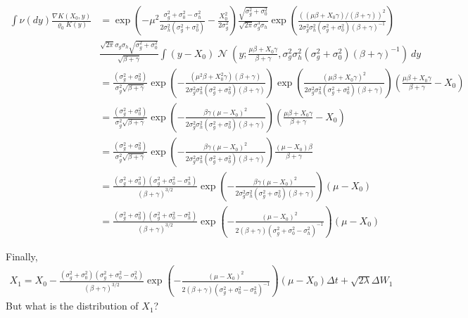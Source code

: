 \documentclass[a4paper]{amsart}
\DeclareMathOperator{\N}{\mathcal{N}}
\begin{document}
\begin{align*}
\int \nu(dy)\frac{\nabla K(X_0, y)}{\varrho_0 K(y)} &= \exp\left( -\mu^2\frac{\sigma_g^2 + \sigma_0^2 - \sigma_h^2}{2\sigma_h^2(\sigma_g^2 + \sigma_0^2)} - \frac{X_0^2}{2\sigma_g^2}\right)\frac{\sqrt{\sigma_g^2 + \sigma_0^2}}{\sqrt{2\pi}\sigma_g^3\sigma_h}\exp\left( \frac{\left((\mu \beta + X_0\gamma)/(\beta + \gamma)\right)^2}{2\sigma_g^2\sigma_h^2(\sigma_g^2 + \sigma_0^2)(\beta + \gamma)^{-1}}\right)\\
&\frac{\sqrt{2\pi}\sigma_g\sigma_h\sqrt{\sigma_g^2 + \sigma_0^2}}{\sqrt{\beta + \gamma}}\int (y - X_0)\N\left(y; \frac{\mu \beta + X_0\gamma}{\beta + \gamma}, \sigma_g^2\sigma_h^2(\sigma_g^2 + \sigma_0^2)(\beta + \gamma)^{-1}\right)\ dy\\
&= \frac{(\sigma_g^2 + \sigma_0^2)}{\sigma_g^2\sqrt{\beta + \gamma}}\exp\left( -\frac{(\mu^2\beta + X_0^2\gamma)(\beta + \gamma)}{2\sigma_g^2\sigma_h^2(\sigma_g^2 + \sigma_0^2)(\beta + \gamma)}\right)\exp\left( \frac{\left(\mu \beta + X_0\gamma\right)^2}{2\sigma_g^2\sigma_h^2(\sigma_g^2 + \sigma_0^2)(\beta + \gamma)}\right)\left(\frac{\mu \beta + X_0\gamma}{\beta + \gamma} - X_0\right)\\
&= \frac{(\sigma_g^2 + \sigma_0^2)}{\sigma_g^2\sqrt{\beta + \gamma}}\exp\left( -\frac{\beta\gamma\left(\mu - X_0\right)^2}{2\sigma_g^2\sigma_h^2(\sigma_g^2 + \sigma_0^2)(\beta + \gamma)}\right)\left(\frac{\mu \beta + X_0\gamma}{\beta + \gamma} - X_0\right)\\
&= \frac{(\sigma_g^2 + \sigma_0^2)}{\sigma_g^2\sqrt{\beta + \gamma}}\exp\left(- \frac{\beta\gamma\left(\mu - X_0\right)^2}{2\sigma_g^2\sigma_h^2(\sigma_g^2 + \sigma_0^2)(\beta + \gamma)}\right)\frac{(\mu - X_0)\beta}{\beta + \gamma}\\
&= \frac{(\sigma_g^2 + \sigma_0^2)(\sigma_g^2 + \sigma_0^2 - \sigma_h^2)}{(\beta + \gamma)^{3/2}}\exp\left(- \frac{\beta\gamma\left(\mu - X_0\right)^2}{2\sigma_g^2\sigma_h^2(\sigma_g^2 + \sigma_0^2)(\beta + \gamma)}\right)(\mu - X_0)\\
&= \frac{(\sigma_g^2 + \sigma_0^2)(\sigma_g^2 + \sigma_0^2 - \sigma_h^2)}{(\beta + \gamma)^{3/2}}\exp\left(- \frac{\left(\mu - X_0\right)^2}{2(\beta + \gamma)(\sigma_g^2 + \sigma_0^2 - \sigma_h^2)^{-1}}\right)(\mu - X_0)
\end{align*}

Finally,
\begin{align*}
X_1 = X_0 -\frac{(\sigma_g^2 + \sigma_0^2)(\sigma_g^2 + \sigma_0^2 - \sigma_h^2)}{(\beta + \gamma)^{3/2}}\exp\left(- \frac{\left(\mu - X_0\right)^2}{2(\beta + \gamma)(\sigma_g^2 + \sigma_0^2 - \sigma_h^2)^{-1}}\right)(\mu - X_0) \Delta t + \sqrt{2\lambda}\Delta W_1
\end{align*}
But what is the distribution of $X_1$?
\end{document}
